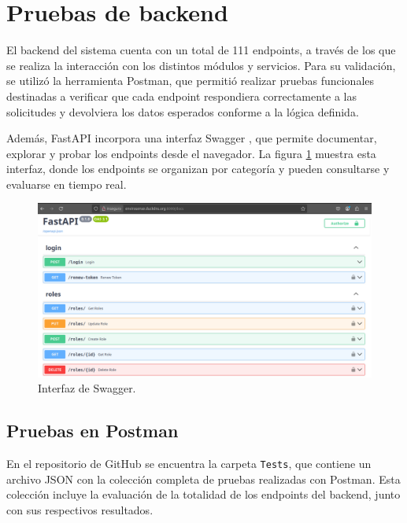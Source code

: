 \section{Pruebas de backend}
\label{sec:pruebas_backend}

El backend del sistema cuenta con un total de 111 endpoints, a través de los
que se realiza la interacción con los distintos módulos y servicios. Para su
validación, se utilizó la herramienta Postman, que permitió realizar pruebas
funcionales destinadas a verificar que cada endpoint respondiera correctamente
a las solicitudes y devolviera los datos esperados conforme a la lógica
definida.

Además, FastAPI incorpora una interfaz Swagger \cite{SwaggerIO}, que permite
documentar, explorar y probar los endpoints desde el navegador. La figura
\ref{fig:swagger} muestra esta interfaz, donde los endpoints se organizan por
categoría y pueden consultarse y evaluarse en tiempo real.

\begin{figure}[H]
    \centering
    \includegraphics[width=\textwidth]{Images/37_swagger.png}
    \caption[Interfaz de Swagger]{Interfaz de Swagger.}
    \label{fig:swagger}
\end{figure}

\subsection{Pruebas en Postman}


En el repositorio de GitHub \cite{EnviroSenseIoT} se encuentra la carpeta
\texttt{Tests}, que contiene un archivo JSON con la colección completa de
pruebas realizadas con Postman. Esta colección incluye la evaluación de la
totalidad de los endpoints del backend, junto con sus respectivos resultados.

